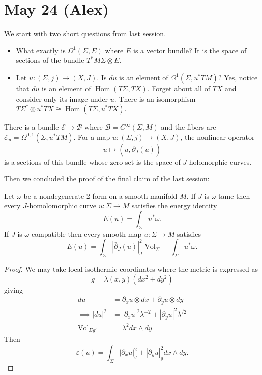 \section{May 24 (Alex)}
We start with two short questions from last session.
\begin{question}\leavevmode
	\begin{itemize}
		\item What exactly is $\Omega^1(\Sigma,E)$ where $E$ is a vector bundle? It is the space of sections of the bundle $T^*M\Sigma\otimes E$.
		
		\item Let $u:(\Sigma,j)\to(X,J)$. Is $du$ is an element of $\Omega^{1}(\Sigma,u^*TM)$? Yes, notice that $du$ is an element of $\operatorname{Hom}(T\Sigma,TX)$. Forget about all of $TX$ and consider only its image under $u$. There is an isomorphism $T\Sigma^*\otimes u^*TX\cong \operatorname{Hom}(T\Sigma,u^*TX)$.
	\end{itemize}
\end{question}
\begin{remark}
	There is a bundle $\mathcal{E}\to\mathcal{B}$ where $\mathcal{B}=C^\infty(\Sigma,M)$ and the fibers are $\mathcal{E}_u=\Omega^{0,1}(\Sigma,u^*TM)$. For a map $u:(\Sigma,j)\to(X,J)$, the nonlinear operator
	\[u\mapsto(u,\bar\partial_J(u))\]
	is a sections of this bundle whose zero-set is the space of $J$-holomorphic curves.
\end{remark}
Then we concluded the proof of the final claim of the last session:

\begin{lemma}
	Let $\omega$ be a nondegenerate 2-form on a smooth manifold $M$. If $J$ is $\omega$-tame then every $J$-homolomorphic curve $u:\Sigma\to M$ satisfies the energy identity
	\[E(u)=\int_\Sigma u^*\omega.\]
	If $J$ is $\omega$-compatible then every smooth map $u:\Sigma\to M$ satisfies
	\[E(u)=\int_\Sigma|\bar\partial_J(u)|^2_J\operatorname{Vol}_\Sigma+\int_\Sigma u^*\omega.\]
\end{lemma}
\begin{proof}
	We may take local isothermic coordinates where the metric is expressed as
	\[g=\lambda(x,y)(dx^2+dy^2)\]
	giving
	\begin{align*}
		du&=\partial_xu\otimes dx+\partial_yu\otimes dy\\
		\implies |du|^2&=|\partial_xu|^2\lambda^{-2}+|\partial_yu|^2\lambda^{/2}\\
		\operatorname{Vol}_{\Sigma g'}&=\lambda^2dx\wedge dy
	\end{align*}
	Then
	\[\varepsilon(u)=\int_\Sigma|\partial_xu|^2_g+|\partial_yu|_g^2dx\wedge dy.\]
\end{proof}

